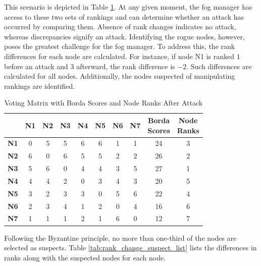 \documentclass{sn-jnl}%
\begin{document}
\begin{itemize}
This scenario is depicted in Table \ref{tab:borda_ranks_aft_attack}. At any given moment, the fog manager has access to these two sets of rankings and can determine whether an attack has occurred by comparing them. Absence of rank changes indicates no attack, whereas discrepancies signify an attack. Identifying the rogue nodes, however, poses the greatest challenge for the fog manager. To address this, the rank differences for each node are calculated. For instance, if node N1 is ranked $1$ before an attack and $3$ afterward, the rank difference is $-2$. Such differences are calculated for all nodes. Additionally, the nodes suspected of manipulating rankings are identified. 
\begin{table}[htbp]
\centering
\caption{Voting Matrix with Borda Scores and Node Ranks After Attack}
\label{tab:borda_ranks_aft_attack}
\begin{tabular}{|c|*{7}{c|}c|c|}
\hline
 & \textbf{N1} & \textbf{N2} & \textbf{N3} & \textbf{N4} & \textbf{N5} & \textbf{N6} & \textbf{N7} & \makecell{\textbf{Borda} \\ \textbf{Scores}} & \makecell{\textbf{Node} \\ \textbf{Ranks}} \\
\hline
\textbf{N1} & 0 & 5 & 5 & 6 & 6 & 1 & 1 & 24 & 3 \\
\hline
\textbf{N2} & 6 & 0 & 6 & 5 & 5 & 2 & 2 & 26 & 2 \\
\hline
\textbf{N3} & 5 & 6 & 0 & 4 & 4 & 3 & 5 & 27 & 1 \\
\hline
\textbf{N4} & 4 & 4 & 2 & 0 & 3 & 4 & 3 & 20 & 5 \\
\hline
\textbf{N5} & 3 & 2 & 3 & 3  & 0 & 5 & 6 & 22 & 4 \\
\hline
\textbf{N6} & 2 & 3 & 4 & 1 & 2 & 0 & 4 & 16 & 6 \\
\hline
\textbf{N7} & 1 & 1 & 1 & 2 & 1 & 6 & 0 & 12 & 7 \\
\hline
\end{tabular}
\end{table}



Following the Byzantine principle, no more than one-third of the nodes are selected as suspects. Table \ref{tab:rank_change_suspect_list} lists the differences in ranks along with the suspected nodes for each node.


\end{itemize}
\end{document}
